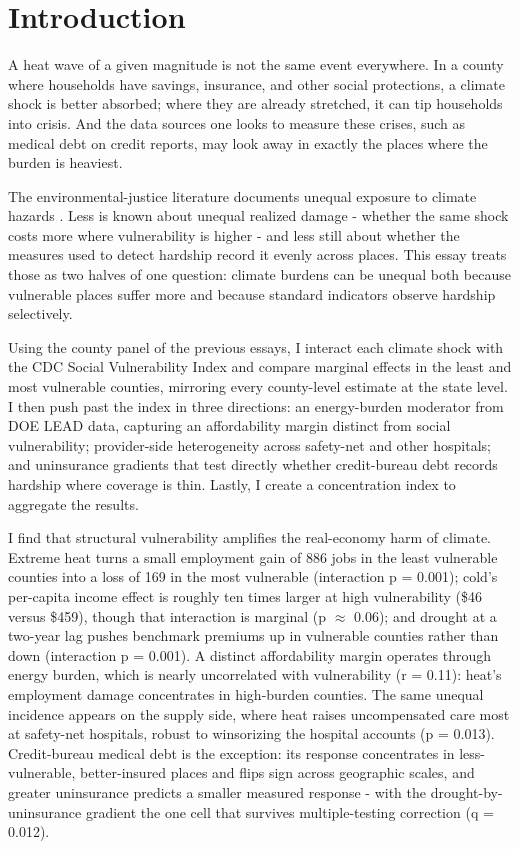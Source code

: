 \documentclass[a4paper,11pt]{report}
\begin{document}
\FloatBarrier
\section{Introduction}

A heat wave of a given magnitude is not the same event everywhere. In a county where households have savings, insurance, and other social protections, a climate shock is better absorbed; where they are already stretched, it can tip households into crisis. And the data sources one looks to measure these crises, such as medical debt on credit reports, may look away in exactly the places where the burden is heaviest.

The environmental-justice literature documents unequal exposure to climate hazards \citep[see][]{banzhaf2019ej}. Less is known about unequal realized damage - whether the same shock costs more where vulnerability is higher - and less still about whether the measures used to detect hardship record it evenly across places. This essay treats those as two halves of one question: climate burdens can be unequal both because vulnerable places suffer more and because standard indicators observe hardship selectively.

Using the county panel of the previous essays, I interact each climate shock with the CDC Social Vulnerability Index and compare marginal effects in the least and most vulnerable counties, mirroring every county-level estimate at the state level. I then push past the index in three directions: an energy-burden moderator from DOE LEAD data, capturing an affordability margin distinct from social vulnerability; provider-side heterogeneity across safety-net and other hospitals; and uninsurance gradients that test directly whether credit-bureau debt records hardship where coverage is thin. Lastly, I create a concentration index to aggregate the results.

I find that structural vulnerability amplifies the real-economy harm of climate. Extreme heat turns a small employment gain of 886 jobs in the least vulnerable counties into a loss of 169 in the most vulnerable (interaction p = 0.001); cold's per-capita income effect is roughly ten times larger at high vulnerability (\textminus{}\$46 versus \textminus{}\$459), though that interaction is marginal (p $\approx$ 0.06); and drought at a two-year lag pushes benchmark premiums up in vulnerable counties rather than down (interaction p = 0.001). A distinct affordability margin operates through energy burden, which is nearly uncorrelated with vulnerability (r = 0.11): heat's employment damage concentrates in high-burden counties. The same unequal incidence appears on the supply side, where heat raises uncompensated care most at safety-net hospitals, robust to winsorizing the hospital accounts (p = 0.013). Credit-bureau medical debt is the exception: its response concentrates in less-vulnerable, better-insured places and flips sign across geographic scales, and greater uninsurance predicts a smaller measured response - with the drought-by-uninsurance gradient the one cell that survives multiple-testing correction (q = 0.012).
\end{document}
